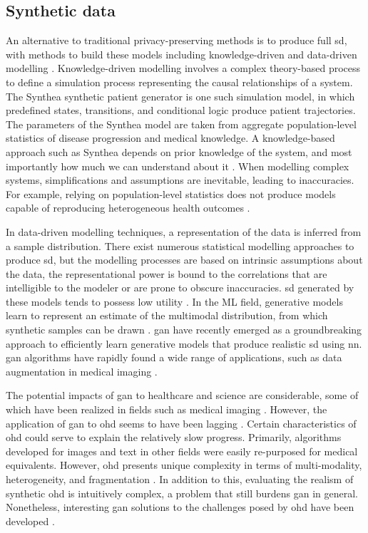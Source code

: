 \subsection{Synthetic data}
An alternative to traditional privacy-preserving methods is to produce full \gls{sd}, with methods to build these models including knowledge-driven and data-driven modelling \cite{Kim_2017}. Knowledge-driven modelling involves a complex theory-based process to define a simulation process representing the causal relationships of a system. The Synthea \cite{Walonoski_2017} synthetic patient generator is one such simulation model, in which predefined states, transitions, and conditional logic produce patient trajectories. The parameters of the Synthea model are taken from aggregate population-level statistics of disease progression and medical knowledge. A knowledge-based approach such as Synthea depends on prior knowledge of the system, and most importantly how much we can understand about it \cite{Kim_2017}. When modelling complex systems, simplifications and assumptions are inevitable, leading to inaccuracies. For example, relying on population-level statistics does not produce models capable of reproducing heterogeneous health outcomes \cite{Chen_2019}.\par
In data-driven modelling techniques, a representation of the data is inferred from a sample distribution. There exist numerous statistical modelling approaches to produce \gls{sd}, but the modelling processes are based on intrinsic assumptions about the data, the representational power is bound to the correlations that are intelligible to the modeler or are prone to obscure inaccuracies. \gls{sd} generated by these models tends to possess low utility \cite{Rankin2020}. In the ML field, generative models learn to represent an estimate of the multimodal distribution, from which synthetic samples can be drawn \cite{goodfellow2016nips}. \Gls{gan} \cite{NIPS2014_5423} have recently emerged as a groundbreaking approach to efficiently learn generative models that produce realistic \gls{sd} using \gls{nn}. \gls{gan} algorithms have rapidly found a wide range of applications, such as data augmentation in medical imaging \cite{Kadurin_2017}.\par
The potential impacts of \gls{gan} to healthcare and science are considerable, some of which have been realized in fields such as medical imaging \cite{Yi_2019}. However, the application of \gls{gan} to \gls{ohd} seems to have been lagging \cite{Xiao_2018_chall}. Certain characteristics of \gls{ohd} could serve to explain the relatively slow progress. Primarily, algorithms developed for images and text in other fields were easily re-purposed for medical equivalents. However, \gls{ohd} presents unique complexity in terms of multi-modality, heterogeneity, and fragmentation \cite{Xiao_2018_chall}. In addition to this, evaluating the realism of synthetic \gls{ohd} is intuitively complex, a problem that still burdens \gls{gan} in general. Nonetheless, interesting \gls{gan} solutions to the challenges posed by \gls{ohd} have been developed \cite{esteban2017real,Che_2017,Choi2017-nt,yahi2017generative}.